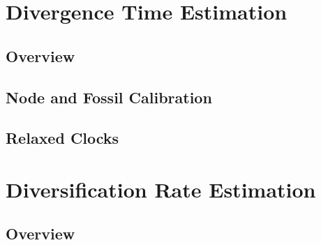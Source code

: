\documentclass[11pt]{book}
\begin{document}
\part{Divergence Time Estimation}

%

\chapter{Overview}
\def \ResourcePath {RB_DivergenceTime_Tutorial/}


\chapter{Node and Fossil Calibration}
\def \ResourcePath {RB_DivergenceTime_Calibration_Tutorial/}


\chapter{Relaxed Clocks}
\def \ResourcePath {RB_DivergenceTime_RelaxedClock_Tutorial/}


%





\part{Diversification Rate Estimation}

\chapter{Overview}
\def \ResourcePath {RB_DiversificationRateIntro_Tutorial/}

\end{document}
